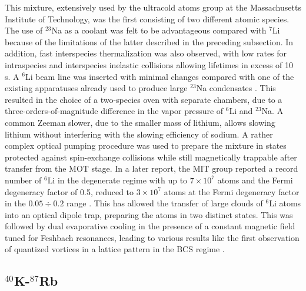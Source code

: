 \documentclass[pra,letterpaper,twocolumn,showpacs,superscriptaddress]{revtex4}
\begin{document}
This mixture, extensively used by the ultracold atoms group at the Massachusetts Institute of Technology, was the first consisting 
of two different atomic species. The use of ${}^{23}$Na as a coolant was felt to be advantageous compared with ${}^7$Li because of the limitations of the 
latter described in the preceding subsection. In addition, fast interspecies thermalization was also observed, with low rates for intraspecies and interspecies 
inelastic collisions allowing lifetimes in excess of 10 s. A ${}^6$Li beam line was inserted with minimal changes compared with one of 
the existing apparatuses already used to produce large ${}^{23}$Na condensates \cite{Hadzibabic2002}. 
This resulted in the choice of a two-species oven with separate chambers, due to a three-orders-of-magnitude difference in the vapor pressure of ${}^6$Li and ${}^{23}$Na.
A common Zeeman slower, due to the smaller mass of lithium, allows slowing lithium without interfering with the slowing efficiency of sodium.
A rather complex optical pumping procedure was used to prepare the mixture in states protected against spin-exchange collisions while still 
magnetically trappable after transfer from the MOT stage.  In a later report, the MIT group reported a record number of ${}^6$Li in the degenerate 
regime with up to $7 \times 10^7$ atoms and the Fermi degeneracy factor of 0.5, reduced to $3 \times 10^7$ atoms at the Fermi degeneracy factor 
in the $0.05 \div 0.2$ range \cite{Hadzibabic2003}. This has allowed the transfer of large clouds of ${}^6$Li atoms into an 
optical dipole trap, preparing the atoms in two distinct states.  This was followed by dual evaporative cooling in the presence of a constant magnetic
field tuned for Feshbach resonances, leading to various results like the first observation of quantized vortices in a lattice pattern in the BCS regime 
\cite{Zwierlein2005,Zwierlein2006,Ketterle2008}. 

\subsection{\bf{${}^{40}$K-${}^{87}$Rb}}
\end{document}
